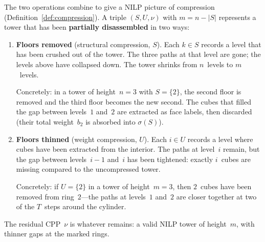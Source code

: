 \documentclass[11pt]{article}
\theoremstyle{plain}
\theoremstyle{definition}
\begin{document}
The two operations combine to give a NILP picture of
compression (Definition~\ref{def:compression}).
A triple $(S, U, \nu)$ with $m = n - |S|$ represents a tower
that has been \textbf{partially disassembled} in two ways:

\begin{enumerate}
  \item \textbf{Floors removed} (structural compression, $S$).
    Each $k \in S$ records a level that has been crushed out of
    the tower.  The three paths at that level are gone; the
    levels above have collapsed down.  The tower shrinks from
    $n$~levels to $m$~levels.

    \smallskip
    Concretely: in a tower of height~$n = 3$ with
    $S = \{2\}$, the second floor is removed and the third
    floor becomes the new second.  The cubes that filled the
    gap between levels~$1$ and~$2$ are extracted as face labels,
    then discarded (their total weight~$b_2$ is absorbed into
    $\sigma(S)$).

  \item \textbf{Floors thinned} (weight compression, $U$).
    Each $i \in U$ records a level where cubes have been
    extracted from the interior.  The paths at level~$i$ remain,
    but the gap between levels~$i{-}1$ and~$i$ has been
    tightened: exactly $i$~cubes are missing compared to the
    uncompressed tower.

    \smallskip
    Concretely: if $U = \{2\}$ in a tower of height~$m = 3$,
    then $2$~cubes have been removed from ring~$2$---the paths
    at levels~$1$ and~$2$ are closer together at two of the
    $T$~steps around the cylinder.
\end{enumerate}

\noindent
The residual CPP~$\nu$ is whatever remains: a valid NILP tower
of height~$m$, with thinner gaps at the marked rings.
\end{document}
